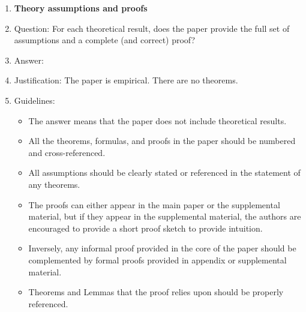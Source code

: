 \begin{enumerate}
\item {\bf Theory assumptions and proofs}
    \item[] Question: For each theoretical result, does the paper provide the full set of assumptions and a complete (and correct) proof?
    \item[] Answer: \answerNA{}
    \item[] Justification: The paper is empirical. There are no theorems.
    \item[] Guidelines:
    \begin{itemize}
        \item The answer \answerNA{} means that the paper does not include theoretical results.
        \item All the theorems, formulas, and proofs in the paper should be numbered and cross-referenced.
        \item All assumptions should be clearly stated or referenced in the statement of any theorems.
        \item The proofs can either appear in the main paper or the supplemental material, but if they appear in the supplemental material, the authors are encouraged to provide a short proof sketch to provide intuition.
        \item Inversely, any informal proof provided in the core of the paper should be complemented by formal proofs provided in appendix or supplemental material.
        \item Theorems and Lemmas that the proof relies upon should be properly referenced.
    \end{itemize}


\end{enumerate}
